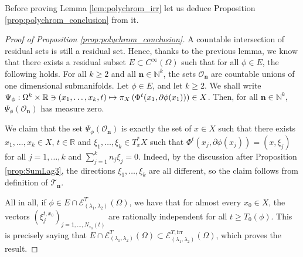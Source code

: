\documentclass[JEP,XML,SOM,Unicode,published]{cedram}
\let\mathcal\mathscr
\newcommand\mto{\mathchoice{\longmapsto}{\mapsto}{\mapsto}{\mapsto}}
\newcommand{\irr}{\mathrm{irr}}
\theoremstyle{plain}
\theoremstyle{definition}
\newcommand{\N}{\mathbb{N}}
\newcommand{\R}{\mathbb{R}}
\def\calT{\mathcal{T}}
\begin{document}
Before proving Lemma \ref{lem:polychrom_irr} let us deduce Proposition \ref{prop:polychrom_conclusion} from it.
\begin{proof}[Proof of Proposition \ref{prop:polychrom_conclusion}]
A countable intersection of residual sets is still a residual set. Hence, thanks to the previous lemma, we know that there exists a residual subset $E\subset C^\infty(\Omega)$ such that for all $\phi\in E$, the following holds. For all $k\geq 2$ and all $\boldsymbol{n}\in \N^k$, the sets $\mathcal{O}_{\boldsymbol{n}}$ are countable unions of one dimensional submanifolds. Let $\phi \in E$, and let $k\geq 2$. We shall write $\Psi_\phi : \Omega^k \times \R \ni (x_1,\dots, x_k,t) \mto \pi_X \left(\Phi^t(x_1, \partial \phi(x_1))\right)\in X$. Then, for all $\boldsymbol{n}\in \N^k$, $\Psi_\phi (\mathcal{O}_{\boldsymbol{n}})$ has measure zero.

We claim that the set $\Psi_\phi (\mathcal{O}_{\boldsymbol{n}})$ is exactly the set of $x\in X$ such that there exists $x_1,\dots, x_k\in X$, $t\in\R$ and $\xi_1,\dots, \xi_k \in T^*_x X$ such that $\Phi^t(x_j, \partial \phi(x_j)) = (x,\xi_j)$ for all $j=1,\dots, k$ and $\sum_{j=1}^k n_j \xi_j= 0$. Indeed, by the discussion after Proposition \ref{prop:SumLag3}, the directions $\xi_1,\dots, \xi_k$ are all different, so the claim follows from definition of $\calT_{\boldsymbol{n}}$.

All in all, if $\phi\in E\cap \mathcal{E}^T_{(\lambda_1,\lambda_2)}(\Omega)$, we have that for almost every $x_0\in X$, the vectors $(\xi_j^{t,x_0})_{j=1,\dots,N_{x_0}(t)}$ are rationally independent for all $t\geq T_0(\phi)$. This is precisely saying that $E\cap \mathcal{E}^T_{(\lambda_1,\lambda_2)}(\Omega)\subset \mathcal{E}^{T,\irr}_{(\lambda_1,\lambda_2)}(\Omega)$, which proves the result.
\end{proof}
\end{document}

